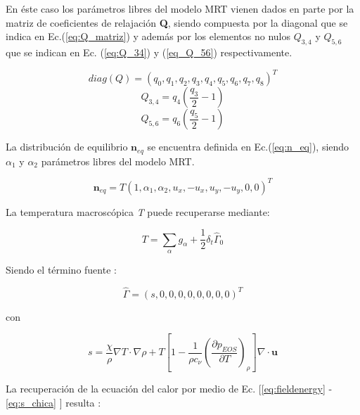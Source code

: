 En éste caso los parámetros libres del modelo MRT vienen dados en parte por la matriz de coeficientes de relajación \textbf{Q}, siendo compuesta por la diagonal que se indica en Ec.(\ref{eq:Q_matriz}) y además por los elementos no nulos $Q_{3,4}$ y $ Q_{5,6}$ que se indican en Ec. (\ref{eq:Q_34}) y (\ref{eq_Q_56})  respectivamente.

\begin{equation}
    \textit{diag} (Q) = {( q_{0} , q_{1} , q_{2} , q_{3} , q_{4} , q_{5} , q_{6} , q_{7} , q_{8} )}^{T}
    \label{eq:Q_matriz}
\end{equation}
\begin{equation}
    Q_{3,4} = q_{4} \left( \frac{q_{3}}{2} - 1 \right)
    \label{eq:Q_34}
\end{equation}
\begin{equation}
    Q_{5,6} = q_{6} \left( \frac{q_{5}}{2} - 1 \right)
    \label{eq_Q_56}
\end{equation}

La distribución de equilibrio $\mathbf{n}_{eq}$ se encuentra definida en Ec.(\ref{eq:n_eq}), siendo $\alpha_{1}$ y $\alpha_{2}$ parámetros libres del modelo MRT.

\begin{equation}
    {\mathbf{n}}_{eq} = T { \left( 1, \alpha_{1}, \alpha_{2}, u_{x}, -u_{x}, u_{y}, -u_{y}, 0, 0 \right) }^{T}
    \label{eq:n_eq}
\end{equation}

La temperatura macroscópica \textit{T} puede recuperarse mediante:

\begin{equation}
T = \sum_{\alpha} g_{\alpha} + \frac{1}{2} \delta_{t} {\hat{\Gamma}}_{0}
\end{equation}



Siendo el término fuente :

\begin{equation}
    \hat{\Gamma} = {( s, 0, 0, 0, 0, 0, 0, 0, 0 )}^{T}
\end{equation}

con 

\begin{equation}
    s = \frac{\chi}{\rho} \nabla T \cdot \nabla \rho + T \left[ 1 - \frac{1}{\rho c_{\nu}} {\left( \frac{\partial p_{EOS}}{\partial T} \right)}_{\rho} \right] \nabla \cdot \mathbf{u}
    \label{eq:s_chica}
\end{equation}

La recuperación de la ecuación del calor por medio de Ec. [\ref{eq:fieldenergy} - \ref{eq:s_chica} ] resulta \cite{markus2011simulation}:

